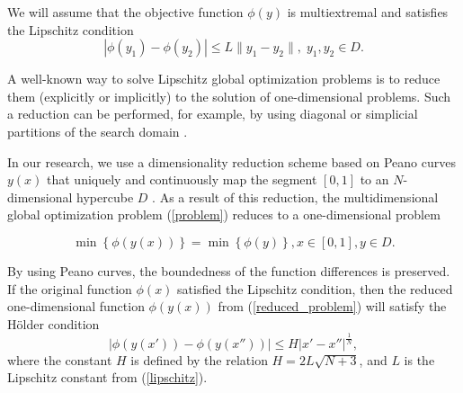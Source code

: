 \documentclass[runningheads]{llncs}
\begin{document}
We will assume that the objective function $\phi(y)$ is multiextremal and satisfies the Lipschitz condition
\begin{equation}\label{lipschitz} 
| \phi (y_1)-\phi (y_2) | \leq L \| y_1-y_2 \|, \; y_1,y_2 \in D.
\end{equation}

A well-known way to solve Lipschitz global optimization problems is to reduce them (explicitly or implicitly) to the solution of one-dimensional problems. Such a reduction can be performed, for example, by using diagonal or simplicial partitions of the search domain \cite{PaulaviciusZilinskas2014,Sergeyev2017}.

In our research, we use a dimensionality reduction scheme based on Peano curves $y(x)$ that uniquely and continuously map the segment $[0,1]$ to an $N$-dimensional hypercube $D$ \cite{Strongin2000}. As a result of this reduction, the multidimensional global optimization problem (\ref{problem}) reduces to a one-dimensional problem

\begin{equation} \label{reduced_problem}
\min \left\{\phi(y(x))\right\} = \min \left\{\phi(y)\right\}, x \in [0,1],  y \in D.
\end{equation}

By using Peano curves, the boundedness of the function differences is preserved. If the original function $\phi(x)$ satisfied the Lipschitz condition, then the reduced one-dimensional function $\phi(y(x))$ from (\ref{reduced_problem}) will satisfy the H{\"o}lder condition
\begin{equation}\label{holder} 
| \phi (y(x'))-\phi (y(x'')) | \leq H | x' - x''|^\frac{1}{N},
\end{equation}
where the constant $H$ is defined by the relation $H=2L\sqrt{N+3}$, and $L$ is the Lipschitz constant from (\ref{lipschitz}).  
\end{document}
